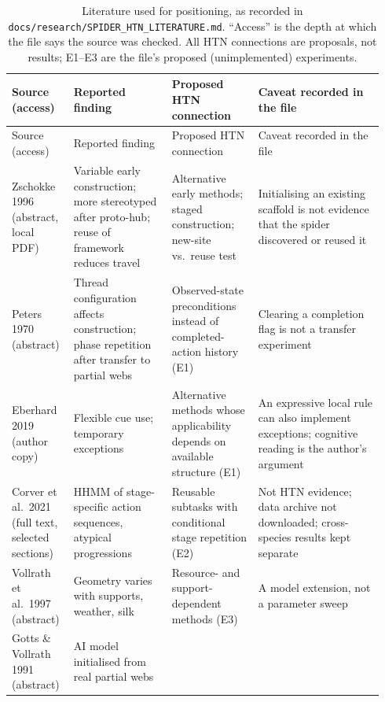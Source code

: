 {\small
\setlength{\tabcolsep}{3pt}
\begin{longtable}{@{}p{0.15\linewidth}p{0.25\linewidth}p{0.22\linewidth}p{0.32\linewidth}@{}}
\caption{Literature used for positioning, as recorded in \texttt{docs/\allowbreak{}research/\allowbreak{}SPIDER\_\allowbreak{}HTN\_\allowbreak{}LITERATURE.md}.
``Access'' is the depth at which the file says the source was checked. All HTN connections are proposals,
not results; E1--E3 are the file's proposed (unimplemented) experiments.}
\label{tab:record-literature}\\
\toprule
Source (access) & Reported finding & Proposed HTN connection & Caveat recorded in the file \\
\midrule
\endfirsthead
\toprule
Source (access) & Reported finding & Proposed HTN connection & Caveat recorded in the file \\
\midrule
\endhead
\bottomrule
\endfoot
Zschokke 1996~\cite{zschokke1996early} (abstract, local PDF) & Variable early construction; more stereotyped
  after proto-hub; reuse of framework reduces travel & Alternative early methods; staged construction; new-site
  vs.\ reuse test & Initialising an existing scaffold is not evidence that the spider discovered or reused it \\
Peters 1970~\cite{peters1970configuration} (abstract) & Thread configuration affects construction; phase
  repetition after transfer to partial webs & Observed-state preconditions instead of completed-action history
  (E1) & Clearing a completion flag is not a transfer experiment \\
Eberhard 2019~\cite{eberhard2019flexibility} (author copy) & Flexible cue use; temporary exceptions &
  Alternative methods whose applicability depends on available structure (E1) & An expressive local rule can
  also implement exceptions; cognitive reading is the author's argument \\
Corver et al.\ 2021~\cite{corver2021stages} (full text, selected sections) & HHMM of stage-specific action
  sequences, atypical progressions & Reusable subtasks with conditional stage repetition (E2) & Not HTN evidence;
  data archive not downloaded; cross-species results kept separate \\
Vollrath et al.\ 1997~\cite{vollrath1997variability} (abstract) & Geometry varies with supports, weather, silk &
  Resource- and support-dependent methods (E3) & A model extension, not a parameter sweep \\
Gotts \& Vollrath 1991~\cite{gotts1991modelling} (abstract) & AI model initialised from real partial webs &

\end{longtable}}
